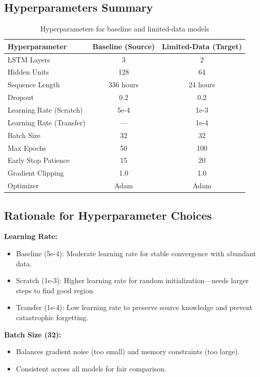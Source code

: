 \documentclass[12pt,a4paper]{report}
\begin{document}
\subsection{Hyperparameters Summary}

\begin{table}[H]
\centering
\caption{Hyperparameters for baseline and limited-data models}
\label{tab:hyperparams}
\small
\begin{tabular}{lcc}
\toprule
\textbf{Hyperparameter} & \textbf{Baseline (Source)} & \textbf{Limited-Data (Target)} \\
\midrule
LSTM Layers & 3 & 2 \\
Hidden Units & 128 & 64 \\
Sequence Length & 336 hours & 24 hours \\
Dropout & 0.2 & 0.2 \\
Learning Rate (Scratch) & 5e-4 & 1e-3 \\
Learning Rate (Transfer) & --- & 1e-4 \\
Batch Size & 32 & 32 \\
Max Epochs & 50 & 100 \\
Early Stop Patience & 15 & 20 \\
Gradient Clipping & 1.0 & 1.0 \\
Optimizer & Adam & Adam \\
\bottomrule
\end{tabular}
\end{table}

\subsection{Rationale for Hyperparameter Choices}

\textbf{Learning Rate:}
\begin{itemize}
    \item Baseline (5e-4): Moderate learning rate for stable convergence with abundant data.
    \item Scratch (1e-3): Higher learning rate for random initialization—needs larger steps to find good region.
    \item Transfer (1e-4): Low learning rate to preserve source knowledge and prevent catastrophic forgetting.
\end{itemize}

\textbf{Batch Size (32):}
\begin{itemize}
    \item Balances gradient noise (too small) and memory constraints (too large).
    \item Consistent across all models for fair comparison.
\end{itemize}
\end{document}
